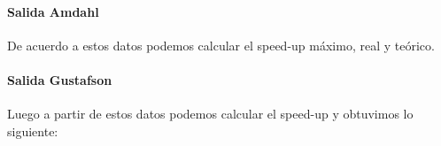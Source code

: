 \paragraph{Salida Amdahl}

    \def\text{Salida de los tiempos en serie y paralelo en milisegundos}
    \def\path{\model_amdahl_output_table.png}
    \def\scale{.6}
    

    De acuerdo a estos datos podemos calcular el speed-up máximo, real y teórico.

    \def\text{Speed-up real, teórico y máximo según la cantidad de threads}
    \def\path{\model_amdahl_speed_up_table.png}
    \def\scale{.6}
    

    \def\text{Gráfico}
    \def\path{\model_amdahl_speed_up.png}
    \def\scale{.6}
    

    \analisisAmdahl

    \newpage

\paragraph{Salida Gustafson}

    \def\text{Salida de los tiempos en serie y paralelo en milisegundos}
    \def\path{\model_gustafson_output_table.png}
    \def\scale{.6}
    

    \analisisGustafson

    \def\text{Tiempo paralelo y serie en función de la dimensión de las matrices de entrada}
    \def\path{\model_gustafson_exec_time.png}
    \def\scale{.6}
    

    \clearpage
    \newpage

    Luego a partir de estos datos podemos calcular el speed-up y obtuvimos lo
    siguiente:

    \def\text{Tabla de valores del speed-up}
    \def\path{\model_gustafson_speed_up_table.png}
    \def\scale{.6}
    

    \def\text{Gráfico del speed-up}
    \def\path{\model_gustafson_speed_up.png}
    \def\scale{.6}
    
